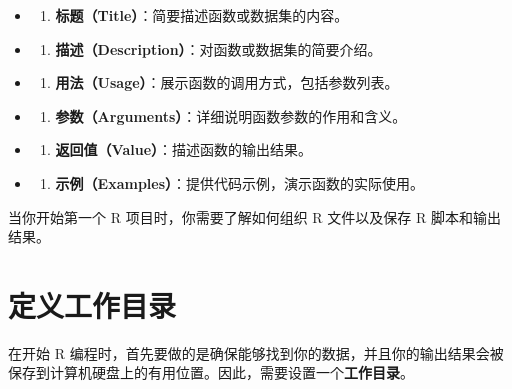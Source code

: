 \documentclass[
]{book}
\providecommand{\tightlist}{%
  \setlength{\itemsep}{0pt}\setlength{\parskip}{0pt}}
\begin{document}
\begin{itemize}
\item
  \begin{enumerate}
  \def\labelenumi{\arabic{enumi}.}
  \tightlist
  \item
    \textbf{标题（Title）}：简要描述函数或数据集的内容。
  \end{enumerate}
\item
  \begin{enumerate}
  \def\labelenumi{\arabic{enumi}.}
  \setcounter{enumi}{1}
  \tightlist
  \item
    \textbf{描述（Description）}：对函数或数据集的简要介绍。
  \end{enumerate}
\item
  \begin{enumerate}
  \def\labelenumi{\arabic{enumi}.}
  \setcounter{enumi}{2}
  \tightlist
  \item
    \textbf{用法（Usage）}：展示函数的调用方式，包括参数列表。
  \end{enumerate}
\item
  \begin{enumerate}
  \def\labelenumi{\arabic{enumi}.}
  \setcounter{enumi}{3}
  \tightlist
  \item
    \textbf{参数（Arguments）}：详细说明函数参数的作用和含义。
  \end{enumerate}
\item
  \begin{enumerate}
  \def\labelenumi{\arabic{enumi}.}
  \setcounter{enumi}{4}
  \tightlist
  \item
    \textbf{返回值（Value）}：描述函数的输出结果。
  \end{enumerate}
\item
  \begin{enumerate}
  \def\labelenumi{\arabic{enumi}.}
  \setcounter{enumi}{5}
  \tightlist
  \item
    \textbf{示例（Examples）}：提供代码示例，演示函数的实际使用。
  \end{enumerate}
\end{itemize}

当你开始第一个 R 项目时，你需要了解如何组织 R 文件以及保存 R 脚本和输出结果。

\section{定义工作目录}\label{ux5b9aux4e49ux5de5ux4f5cux76eeux5f55}

在开始 R 编程时，首先要做的是确保能够找到你的数据，并且你的输出结果会被保存到计算机硬盘上的有用位置。因此，需要设置一个\textbf{工作目录}。
\end{document}
